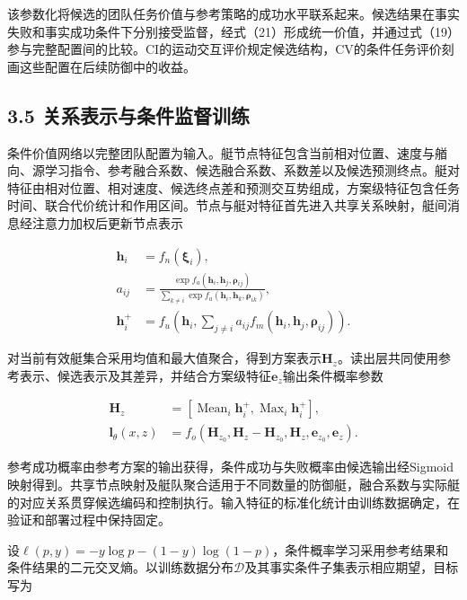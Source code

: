 \documentclass[UTF8,10.5pt,a4paper,fontset=none]{ctexart}
\begin{document}
该参数化将候选的团队任务价值与参考策略的成功水平联系起来。候选结果在事实失败和事实成功条件下分别接受监督，经式（21）形成统一价值，并通过式（19）参与完整配置间的比较。CI的运动交互评价规定候选结构，CV的条件任务评价刻画这些配置在后续防御中的收益。

\subsection{3.5
关系表示与条件监督训练}\label{ux5173ux7cfbux8868ux793aux4e0eux6761ux4ef6ux76d1ux7763ux8badux7ec3}

条件价值网络以完整团队配置为输入。艇节点特征包含当前相对位置、速度与艏向、源学习指令、参考融合系数、候选融合系数、系数差以及候选预测终点。艇对特征由相对位置、相对速度、候选终点差和预测交互势组成，方案级特征包含任务时间、联合代价统计和作用区间。节点与艇对特征首先进入共享关系映射，艇间消息经注意力加权后更新节点表示

\[
\begin{aligned}
\boldsymbol h_i&=f_n(\boldsymbol\xi_i),\\
a_{ij}&=
\frac{\exp f_a(\boldsymbol h_i,\boldsymbol h_j,\boldsymbol\rho_{ij})}
{\sum_{k\ne i}\exp f_a(\boldsymbol h_i,\boldsymbol h_k,\boldsymbol\rho_{ik})},\\
\boldsymbol h_i^+&=f_u\left(\boldsymbol h_i,
\sum_{j\ne i}a_{ij}f_m(\boldsymbol h_i,\boldsymbol h_j,\boldsymbol\rho_{ij})\right).
\end{aligned}
\tag{22}
\]

对当前有效艇集合采用均值和最大值聚合，得到方案表示\(\boldsymbol H_z\)。读出层共同使用参考表示、候选表示及其差异，并结合方案级特征\(\boldsymbol e_z\)输出条件概率参数

\[
\begin{aligned}
\boldsymbol H_z&=
\left[\operatorname{Mean}_i\boldsymbol h_i^+,
\operatorname{Max}_i\boldsymbol h_i^+\right],\\
\boldsymbol l_\theta(x,z)&=
 f_o(\boldsymbol H_{z_0},\boldsymbol H_z-\boldsymbol H_{z_0},
 \boldsymbol H_z,\boldsymbol e_{z_0},\boldsymbol e_z).
\end{aligned}
\tag{23}
\]

参考成功概率由参考方案的输出获得，条件成功与失败概率由候选输出经Sigmoid映射得到。共享节点映射及艇队聚合适用于不同数量的防御艇，融合系数与实际艇的对应关系贯穿候选编码和控制执行。输入特征的标准化统计由训练数据确定，在验证和部署过程中保持固定。

设\(\ell(p,y)=-y\log p-(1-y)\log(1-p)\)，条件概率学习采用参考结果和条件结果的二元交叉熵。以训练数据分布\(\mathcal D\)及其事实条件子集表示相应期望，目标写为
\end{document}
